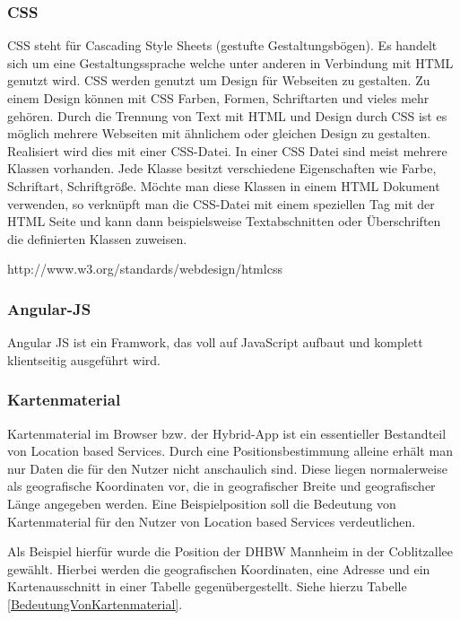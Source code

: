 \subsubsection{CSS}
CSS steht für Cascading Style Sheets (gestufte Gestaltungsbögen). Es handelt sich um eine Gestaltungssprache welche unter anderen in Verbindung mit HTML genutzt wird. CSS werden genutzt um Design für Webseiten zu gestalten. Zu einem Design können mit CSS Farben, Formen, Schriftarten und vieles mehr gehören. Durch die Trennung von Text mit HTML und Design durch CSS ist es möglich mehrere Webseiten mit ähnlichem oder gleichen Design zu gestalten. Realisiert wird dies mit einer CSS-Datei. In einer CSS Datei sind meist mehrere Klassen vorhanden. Jede Klasse besitzt verschiedene Eigenschaften wie Farbe, Schriftart, Schriftgröße. Möchte man diese Klassen in einem HTML Dokument verwenden, so verknüpft man die CSS-Datei mit einem speziellen Tag  mit der HTML Seite und kann dann beispielsweise Textabschnitten oder Überschriften die definierten Klassen zuweisen.

http://www.w3.org/standards/webdesign/htmlcss

\subsubsection{Angular-JS}
Angular JS ist ein Framwork, das voll auf JavaScript aufbaut und komplett klientseitig ausgeführt wird.

\subsubsection{Kartenmaterial}
Kartenmaterial im Browser bzw. der Hybrid-App ist ein essentieller Bestandteil von Location based Services. Durch eine Positionsbestimmung alleine erhält man nur Daten die für den Nutzer nicht anschaulich sind. Diese liegen normalerweise als geografische Koordinaten vor, die in geografischer Breite und geografischer Länge angegeben werden. Eine Beispielposition soll die Bedeutung von Kartenmaterial für den Nutzer von Location based Services verdeutlichen.

Als Beispiel hierfür wurde die Position der DHBW Mannheim in der Coblitzallee gewählt. Hierbei werden die geografischen Koordinaten, eine Adresse und ein Kartenausschnitt in einer Tabelle gegenübergestellt. Siehe hierzu Tabelle \ref{BedeutungVonKartenmaterial}.

